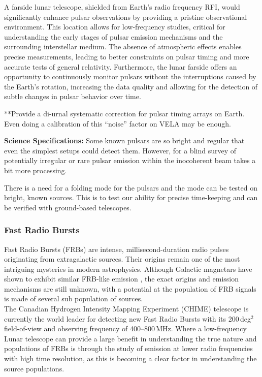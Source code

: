 A farside lunar telescope, shielded from Earth’s radio frequency RFI, would significantly enhance pulsar observations by providing a pristine observational environment. This location allows for low-frequency studies, critical for understanding the early stages of pulsar emission mechanisms and the surrounding interstellar medium. The absence of atmospheric effects enables precise measurements, leading to better constraints on pulsar timing and more accurate tests of general relativity. Furthermore, the lunar farside offers an opportunity to continuously monitor pulsars without the interruptions caused by the Earth’s rotation, increasing the data quality and allowing for the detection of subtle changes in pulsar behavior over time.

**Provide a di-urnal systematic correction for pulsar timing arrays on Earth. Even doing a calibration of this “noise” factor on VELA may be enough.

\textbf{Science Specifications:} Some known pulsars are so bright and regular that even the simplest setups could detect them. However, for a blind survey of potentially irregular or rare pulsar emission within the inocoherent beam takes a bit more processing. 

There is a need for a folding mode for the pulsars and the mode can be tested on bright, known sources. This is to test our ability for precise time-keeping and can be verified with ground-based telescopes.



\subsubsection{Fast Radio Bursts}
Fast Radio Bursts (FRBs) are intense, millisecond-duration radio pulses originating from extragalactic sources. Their origins remain one of the most intriguing mysteries in modern astrophysics. Although Galactic magnetars have shown to exhibit similar FRB-like emission \citep{BC_2020}, the exact origins and emission mechanisms are still unknown, with a potential at the population of FRB signals is made of several sub population of sources.  \\ 

The Canadian Hydrogen Intensity Mapping Experiment (CHIME) telescope is currently the world leader for detecting new Fast Radio Bursts with its 200\,deg$^{2}$ field-of-view and observing frequency of 400--800\,MHz. %
Where a low-frequency Lunar telescope can provide a large benefit in understanding the true nature and populations of FRBs is through the study of emission at lower radio frequencies with high time resolution, as this is becoming a clear factor in understanding the source populations. \\ 

